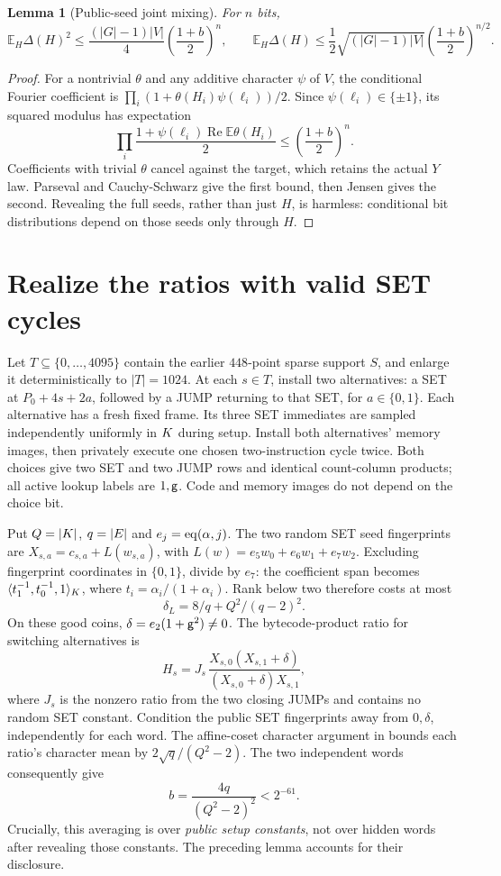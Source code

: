 \documentclass[11pt]{article}
\newtheorem{lemma}{Lemma}
\begin{document}
\begin{lemma}[Public-seed joint mixing]
For $n$ bits,
\[
 \mathbb E_H\Delta(H)^2\le
 \frac{(|G|-1)|V|}{4}\left(\frac{1+b}{2}\right)^n,
 \qquad
 \mathbb E_H\Delta(H)\le
 \frac12\sqrt{(|G|-1)|V|}\left(\frac{1+b}{2}\right)^{n/2}.
\]
\end{lemma}
\begin{proof}
For a nontrivial $\theta$ and any additive character $\psi$ of $V$, the conditional Fourier coefficient is $\prod_i(1+\theta(H_i)\psi(\ell_i))/2$. Since $\psi(\ell_i)\in\{\pm1\}$, its squared modulus has expectation
\[
 \prod_i\frac{1+\psi(\ell_i)\operatorname{Re}\mathbb E\theta(H_i)}2
 \le\left(\frac{1+b}{2}\right)^n.
\]
Coefficients with trivial $\theta$ cancel against the target, which retains the actual $Y$ law. Parseval and Cauchy-Schwarz give the first bound, then Jensen gives the second. Revealing the full seeds, rather than just $H$, is harmless: conditional bit distributions depend on those seeds only through $H$.
\end{proof}

\section{Realize the ratios with valid SET cycles}

Let $T\subseteq\{0,\ldots,4095\}$ contain the earlier $448$-point sparse support $S$, and enlarge it deterministically to $|T|=1024$. At each $s\in T$, install two alternatives: a SET at $P_0+4s+2a$, followed by a JUMP returning to that SET, for $a\in\{0,1\}$. Each alternative has a fresh fixed frame. Its three SET immediates are sampled independently uniformly in $K$ during setup. Install both alternatives' memory images, then privately execute one chosen two-instruction cycle twice. Both choices give two SET and two JUMP rows and identical count-column products; all active lookup labels are $1,\mathsf{g}$. Code and memory images do not depend on the choice bit.

Put $Q=|K|$, $q=|E|$ and $e_j=\operatorname{eq}(\alpha,j)$. The two random SET seed fingerprints are $X_{s,a}=c_{s,a}+L(w_{s,a})$, with $L(w)=e_5w_0+e_6w_1+e_7w_2$. Excluding fingerprint coordinates in $\{0,1\}$, divide by $e_7$: the coefficient span becomes $\langle t_1^{-1},t_0^{-1},1\rangle_{K}$, where $t_i=\alpha_i/(1+\alpha_i)$. Rank below two therefore costs at most
\[
 \delta_L=8/q+Q^2/(q-2)^2.
\]
On these good coins, $\delta=e_2(1+\mathsf{g}^2)\ne0$. The bytecode-product ratio for switching alternatives is
\[
 H_s=J_s\,
 \frac{X_{s,0}(X_{s,1}+\delta)}{(X_{s,0}+\delta)X_{s,1}},
\]
where $J_s$ is the nonzero ratio from the two closing JUMPs and contains no random SET constant. Condition the public SET fingerprints away from $0,\delta$, independently for each word. The affine-coset character argument in  bounds each ratio's character mean by $2\sqrt q/(Q^2-2)$. The two independent words consequently give
\[
 b=\frac{4q}{(Q^2-2)^2}<2^{-61}.
\]
Crucially, this averaging is over \emph{public setup constants}, not over hidden words after revealing those constants. The preceding lemma accounts for their disclosure.
\end{document}
